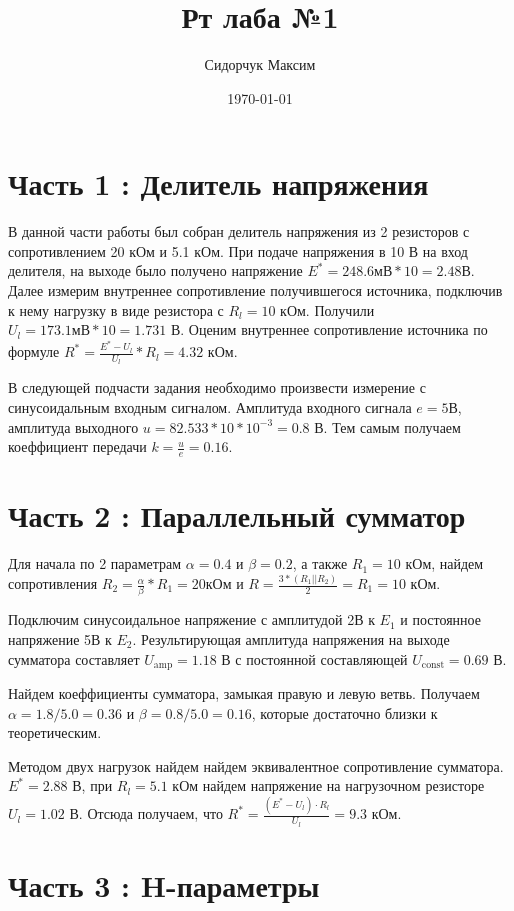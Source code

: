 \documentclass[a4paper]{article}
\date{\today}
\title{Рт лаба №1}
\author{Сидорчук Максим}
\begin{document}
\maketitle

\section{Часть 1 : Делитель напряжения}

В данной части работы был собран делитель напряжения из 2 резисторов с сопротивлением 20 кОм и 5.1 кОм.
При подаче напряжения в 10 В на вход делителя, на выходе было получено напряжение \(E^* = 248.6 \text {мВ} * 10 = 2.48 \text {В}\).
Далее измерим внутреннее сопротивление получившегося источника, подключив к нему нагрузку
в виде резистора с \(R_l = 10\) кОм. Получили \(U_l = 173.1 \text{мВ} * 10 = 1.731\) В. Оценим
внутреннее сопротивление источника по формуле \(R^* = \frac{E^* - U_l}{U_l} * R_l = 4.32\) кОм.

В следующей подчасти задания необходимо произвести измерение с синусоидальным входным сигналом.
Амплитуда входного сигнала \(e = 5\)В, амплитуда выходного \(u = 82.533 * 10 * 10^{-3} = 0.8\) В.
Тем самым получаем коеффициент передачи \(k = \frac{u}{e} = 0.16\).

\section{Часть 2 : Параллельный сумматор}

Для начала по 2 параметрам \(\alpha = 0.4\) и \(\beta = 0.2\), а также \(R_1 = 10\) кОм,
найдем сопротивления \(R_2 = \frac{\alpha}{\beta} * R_1 = 20 \text{кОм и } R = \frac{3 * (R_1 || R_2)}{2} = R_1 = 10\) кОм.

Подключим синусоидальное напряжение с амплитудой 2В к $E_1$ и постоянное напряжение 5В к $E_2$. Результирующая амплитуда
напряжения на выходе сумматора составляет $U_\text{amp} = 1.18$ В с постоянной составляющей $U_\text{const} = 0.69$ В.

Найдем коеффициенты сумматора, замыкая правую и левую ветвь. Получаем $\alpha = 1.8 / 5.0 = 0.36$ и $\beta = 0.8 / 5.0 = 0.16$, которые достаточно близки к теоретическим.

Методом двух нагрузок найдем найдем эквивалентное сопротивление сумматора. $E^* = 2.88$ В, при $R_l = 5.1$ кОм найдем напряжение на нагрузочном резисторе $U_l = 1.02$ В.
Отсюда получаем, что $R^* = \frac{(E^* - U_l) \cdot R_l}{U_l} = 9.3$ кОм.

\section{Часть 3 : H-параметры}
\end{document}
